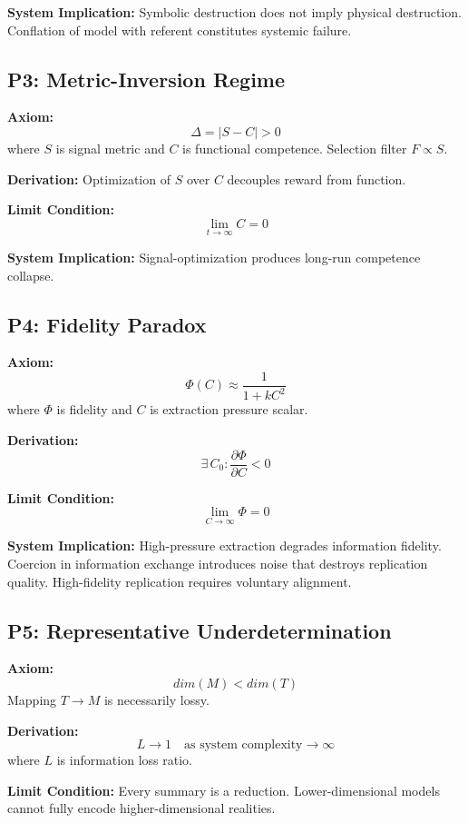 \documentclass{article}
\begin{document}
\textbf{System Implication:} Symbolic destruction does not imply physical destruction.
Conflation of model with referent constitutes systemic failure.

\bigskip

\subsection*{P3: Metric-Inversion Regime}

\textbf{Axiom:}
\[ \Delta = |S - C| > 0 \]
where $S$ is signal metric and $C$ is functional competence. Selection filter
$F \propto S$.

\textbf{Derivation:} Optimization of $S$ over $C$ decouples reward from function.

\textbf{Limit Condition:}
\[ \lim_{t \to \infty} C = 0 \]

\textbf{System Implication:} Signal-optimization produces long-run competence collapse.

\bigskip

\subsection*{P4: Fidelity Paradox}

\textbf{Axiom:}
\[ \Phi(C) \approx \frac{1}{1 + kC^2} \]
where $\Phi$ is fidelity and $C$ is extraction pressure scalar.

\textbf{Derivation:}
\[ \exists\, C_0 : \frac{\partial \Phi}{\partial C} < 0 \]

\textbf{Limit Condition:}
\[ \lim_{C \to \infty} \Phi = 0 \]

\textbf{System Implication:} High-pressure extraction degrades information fidelity.
Coercion in information exchange introduces noise that destroys replication quality.
High-fidelity replication requires voluntary alignment.

\bigskip

\subsection*{P5: Representative Underdetermination}

\textbf{Axiom:}
\[ dim(M) < dim(T) \]
Mapping $T \to M$ is necessarily lossy.

\textbf{Derivation:}
\[ L \rightarrow 1 \quad \text{as system complexity} \rightarrow \infty \]
where $L$ is information loss ratio.

\textbf{Limit Condition:} Every summary is a reduction. Lower-dimensional models
cannot fully encode higher-dimensional realities.
\end{document}
